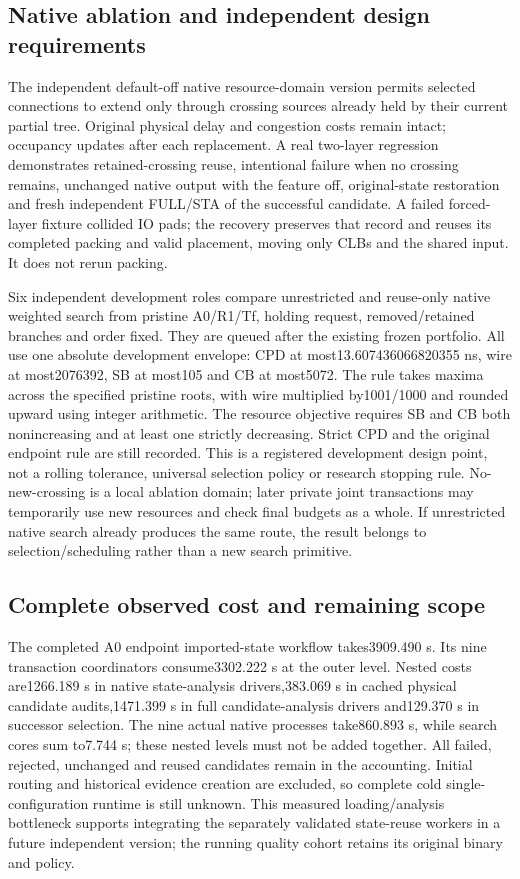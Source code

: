 \subsection{Native ablation and independent design requirements}
The independent default-off native resource-domain version permits selected connections to extend only through crossing sources already held by their current partial tree. Original physical delay and congestion costs remain intact; occupancy updates after each replacement. A real two-layer regression demonstrates retained-crossing reuse, intentional failure when no crossing remains, unchanged native output with the feature off, original-state restoration and fresh independent FULL/STA of the successful candidate. A failed forced-layer fixture collided IO pads; the recovery preserves that record and reuses its completed packing and valid placement, moving only CLBs and the shared input. It does not rerun packing.

Six independent development roles compare unrestricted and reuse-only native weighted search from pristine A0/R1/Tf, holding request, removed/retained branches and order fixed. They are queued after the existing frozen portfolio. All use one absolute development envelope: CPD at most13.607436066820355 ns, wire at most2076392, SB at most105 and CB at most5072. The rule takes maxima across the specified pristine roots, with wire multiplied by1001/1000 and rounded upward using integer arithmetic. The resource objective requires SB and CB both nonincreasing and at least one strictly decreasing. Strict CPD and the original endpoint rule are still recorded. This is a registered development design point, not a rolling tolerance, universal selection policy or research stopping rule. No-new-crossing is a local ablation domain; later private joint transactions may temporarily use new resources and check final budgets as a whole. If unrestricted native search already produces the same route, the result belongs to selection/scheduling rather than a new search primitive.

\subsection{Complete observed cost and remaining scope}
The completed A0 endpoint imported-state workflow takes3909.490 s. Its nine transaction coordinators consume3302.222 s at the outer level. Nested costs are1266.189 s in native state-analysis drivers,383.069 s in cached physical candidate audits,1471.399 s in full candidate-analysis drivers and129.370 s in successor selection. The nine actual native processes take860.893 s, while search cores sum to7.744 s; these nested levels must not be added together. All failed, rejected, unchanged and reused candidates remain in the accounting. Initial routing and historical evidence creation are excluded, so complete cold single-configuration runtime is still unknown. This measured loading/analysis bottleneck supports integrating the separately validated state-reuse workers in a future independent version; the running quality cohort retains its original binary and policy.
